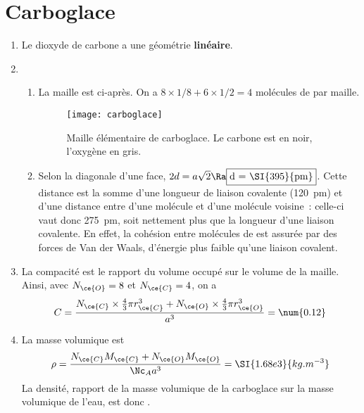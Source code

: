 \documentclass[a4paper, 12pt, final, garamond]{book}
\begin{document}
\section{Carboglace}
\begin{enumerate}
  \item Le dioxyde de carbone a une géométrie \textbf{linéaire}.
  \item 
    \begin{enumerate}
      \item La maille est ci-après. On a $8\times1/8+6\times1/2 = 4$ molécules
        de  par maille.
        \begin{figure}[h]
          \centering
          \texttt{[image: carboglace]}
          \caption{Maille élémentaire de carboglace. Le carbone est en noir,
          l'oxygène en gris.}
          \label{fig:cbgl}
        \end{figure}
      \item Selon la diagonale d'une face, $2d = a \sqrt{2} \Ra \fbox{d =
        \SI{395}{pm}}$. Cette distance est la somme d'une longueur de liaison
        covalente  (\SI{120}{pm}) et d'une distance entre  d'une
        molécule et  d'une molécule voisine~: celle-ci vaut donc
        \SI{275}{pm}, soit nettement plus que la longueur d'une liaison
        covalente. En effet, la cohésion entre molécules de  est assurée
        par des forces de Van der Waals, d'énergie plus faible qu'une liaison
        covalent.
    \end{enumerate}
  \item La compacité est le rapport du volume occupé sur le volume de la maille.
    Ainsi, avec $N_{\ce{O}} = 8$ et $N_{\ce{C}} = 4$, on a
    \[
      C = \frac{N_{\ce{C}}\times \frac{4}{3}\pi r_{\ce{C}}^{3} +
      N_{\ce{O}}\times \frac{4}{3}\pi r_{\ce{O}}^{3} }{a^3} = \num{0.12}
    \]
  \item La masse volumique est
    \[
      \rho = \frac{N_{\ce{C}}M_{\ce{C}} + N_{\ce{O}}M_{\ce{O}}}{\Nc_A a^3}
      = \SI{1.68e3}{kg.m ^{-3}}
    \]
    La densité, rapport de la masse volumique de la carboglace sur la masse
    volumique de l'eau, est donc .
\end{enumerate}
\end{document}
